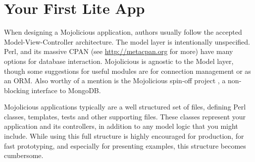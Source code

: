 \section{Your First Lite App}


When designing a Mojolicious application, authors usually follow the accepted Model-View-Controller architecture.
The model layer is intentionally unspecified.
Perl, and its massive CPAN (see \url{http://metacpan.org} for more) have many options for database interaction.
Mojolicious is agnostic to the Model layer, though some suggestions for useful modules are  for connection management or  as an ORM.
Also worthy of a mention is the Mojolicious spin-off project , a non-blocking interface to MongoDB.

Mojolicious applications typically are a well structured set of files, defining Perl classes, templates, tests and other supporting files.
These classes represent your application and its controllers, in addition to any model logic that you might include.
While using this full structure is highly encouraged for production, for fast prototyping, and especially for presenting examples, this structure becomes cumbersome.
